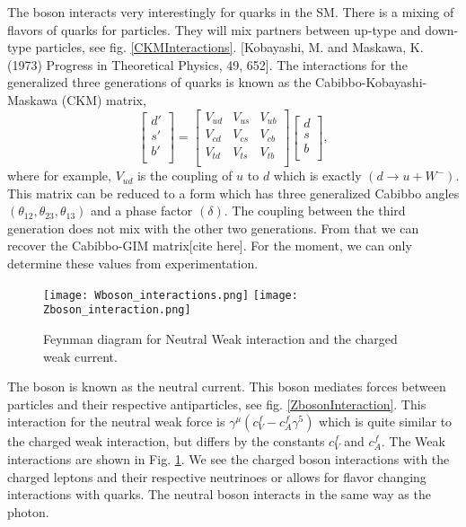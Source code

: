 The \W{} boson interacts very interestingly for quarks in the SM. There is a mixing of flavors of quarks for particles. They will mix partners between up-type and down-type particles, see fig. \ref{CKMInteractions}. [Kobayashi, M. and Maskawa, K. (1973) Progress in Theoretical Physics, 49, 652]. The interactions for the generalized three generations of quarks is known as the Cabibbo-Kobayashi-Maskawa (CKM) matrix,
\begin{equation}\label{CKM}
\begin{bmatrix}
d' \\
s' \\
b' \\
\end{bmatrix} =
\begin{bmatrix}
V_{ud} & V_{us} & V_{ub} \\
V_{cd} & V_{cs} & V_{cb} \\
V_{td} & V_{ts} & V_{tb} \\
\end{bmatrix}
\begin{bmatrix}
d \\
s \\
b \\
\end{bmatrix},
\end{equation}
where for example, $V_{ud}$ is the coupling of $u$ to $d$ which is exactly $(d\rightarrow u+W^-)$. This matrix can be reduced to a form which has three generalized Cabibbo angles $(\theta_{12},\theta_{23},\theta_{13})$ and a phase factor $(\delta)$. The coupling between the third generation does not mix with the other two generations. From that we can recover the Cabibbo-GIM matrix[cite here]. For the moment, we can only determine these values from experimentation. 

\begin{figure}[!htb]
	  \texttt{[image: Wboson\_interactions.png]}
	\endminipage\hfill
	  \texttt{[image: Zboson\_interaction.png]}
	\endminipage\hfill
	\caption[Weak Feynman Diagrams]{Feynman diagram for Neutral Weak interaction and the charged weak current.}
 	\label{WeakRules} 
\end{figure}

The \Z{} boson is known as the neutral current. This boson mediates forces between particles and their respective antiparticles, see fig. \ref{ZbosonInteraction}. This interaction for the neutral weak force is $\gamma^\mu(c_V^f-c_A^f\gamma^5)$ which is quite similar to the charged weak interaction, but differs by the constants $c_V^f$ and $c_A^f$. The Weak interactions are shown in Fig. \ref{WeakRules}. We see the charged \W{} boson interactions with the charged leptons and their respective neutrinoes or allows for flavor changing interactions with quarks. The neutral \Z{} boson interacts in the same way as the photon. 

